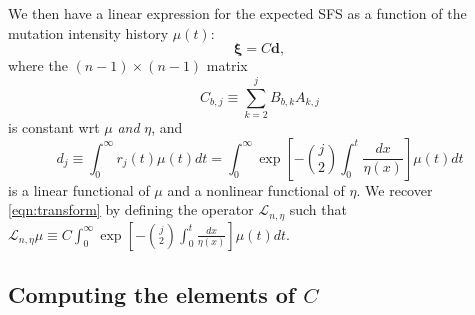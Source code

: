 \documentclass[11pt]{article}
\begin{document}
We then have a linear expression for the expected SFS as a function of the mutation intensity history $\mu(t)$:
\begin{equation}
\label{eqn:xivec}
\boldsymbol\xi = C \boldsymbol d,
\end{equation}
where the $(n-1)\times(n-1)$ matrix
\[
C_{b,j} \equiv \sum_{k=2}^j B_{b,k} A_{k,j}
\]
is constant wrt $\mu$ \emph{and} $\eta$, and
\begin{equation}
\label{eqn:d}
d_j \equiv \int_0^\infty r_j(t)\mu(t)dt = \int_0^\infty \exp\left[-\binom{j}{2}\int_0^t\frac{dx}{\eta(x)}\right]\mu(t)dt
\end{equation}
is a linear functional of $\mu$ and a nonlinear functional of $\eta$.
We recover \ref{eqn:transform} by defining the operator $\mathcal{L}_{n,\eta}$ such that $\mathcal{L}_{n,\eta}\mu \equiv C \int_0^\infty \exp\left[-\binom{j}{2}\int_0^t\frac{dx}{\eta(x)}\right]\mu(t)dt$.

\subsection{Computing the elements of $C$}\label{sec:methods:C}
\end{document}
